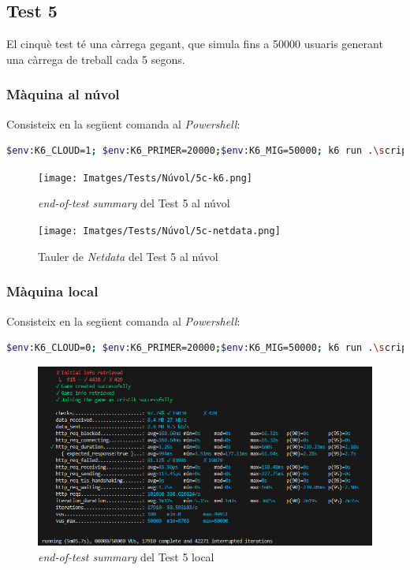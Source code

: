 \newpage
\subsection{Test 5}

El cinquè test té una càrrega gegant, que simula fins a 50000 usuaris generant una càrrega de treball cada 5 segons.

\subsubsection{Màquina al núvol}
Consisteix en la següent comanda al \textit{Powershell}:
\begin{lstlisting}[language=bash, caption=Test 5 al núvol]
    $env:K6_CLOUD=1; $env:K6_PRIMER=20000;$env:K6_MIG=50000; k6 run .\script.js
\end{lstlisting}

\begin{figure}[!htbp]
    \texttt{[image: Imatges/Tests/Núvol/5c-k6.png]}  
    \caption{\textit{end-of-test summary} del Test 5 al núvol}
\end{figure}

\begin{figure}[!htbp]
    \texttt{[image: Imatges/Tests/Núvol/5c-netdata.png]}  
    \caption{Tauler de \textit{Netdata} del Test 5 al núvol}
\end{figure}

\subsubsection{Màquina local}
Consisteix en la següent comanda al \textit{Powershell}:
\begin{lstlisting}[language=bash, caption=Test 5 local]
    $env:K6_CLOUD=0; $env:K6_PRIMER=20000;$env:K6_MIG=50000; k6 run .\script.js
\end{lstlisting}

\begin{figure}[!htbp]
    \includegraphics[width=1\textwidth]{Imatges/Tests/Local/5l-k6.png}  
    \caption{\textit{end-of-test summary} del Test 5 local}
\end{figure}

